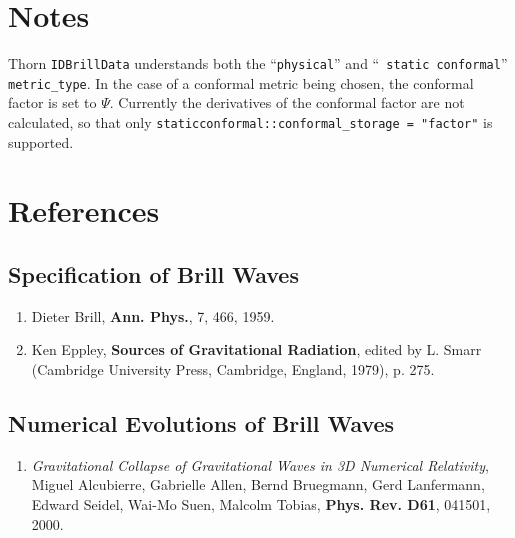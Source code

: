 \documentclass{article}
\begin{document}
\section{Notes}

Thorn {\tt IDBrillData} understands both the ``{\tt physical}'' and ``{\tt
static conformal}'' {\tt metric\_type}. In the case of a conformal
metric being chosen, the conformal factor is set to $\Psi$. Currently
the derivatives of the conformal factor are not calculated, so that
only {\tt staticconformal::conformal\_storage = "factor"} is
supported.

\section{References}

\subsection{Specification of Brill Waves}

\begin{enumerate}

\item Dieter Brill, {\bf Ann. Phys.}, 7, 466, 1959.

\item Ken Eppley, {\bf Sources of Gravitational Radiation}, edited by L. Smarr (Cambridge University Press, 
Cambridge, England, 1979), p. 275.

\end{enumerate}

\subsection{Numerical Evolutions of Brill Waves}

\begin{enumerate}

\item {\it Gravitational Collapse of Gravitational Waves in 3D Numerical Relativity}, 
 Miguel Alcubierre, Gabrielle Allen, Bernd Bruegmann, Gerd Lanfermann, Edward Seidel, Wai-Mo Suen, Malcolm Tobias,
{\bf Phys. Rev. D61}, 041501, 2000.

\end{enumerate}

\end{document}

